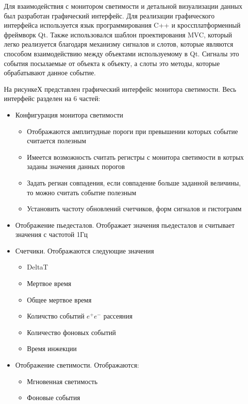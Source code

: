   Для взаимодействия с монитором светимости и детальной визуализации данных был разработан графический интерфейс. Для реализации графического интерфейса используется язык программирования C++ и кроссплатформенный фреймворк Qt. Также использовался шаблон проектирования MVC, который легко реализуется благодаря механизму сигналов и слотов, которые являются способом взаимодействию между объектами используемому в Qt. Сигналы это события посылаемые от объекта к объекту, а слоты это методы, которые обрабатывают данное событие.\par
  На рисункеХ представлен графический интерфейс монитора светимости. Весь интерфейс разделен на 6 частей:
\begin{itemize}
  \item Конфигурация монитора светимости
    \begin{itemize}
      \item Отображаются амплитудные пороги при превышении которых событие считается полезным
      \item Имеется возможность считать регистры с монитора светимости в котрых заданы значения данных порогов
      \item Задать региан совпадения, если совпадение больше заданной величины, то можно считать событие полезным
      \item Установить частоту обновлений счетчиков, форм сигналов и гистограмм
    \end{itemize} 
  \item Отображение пьедесталов. Отображает значения пьедесталов и считывает значения с частотой 1Гц
  \item Счетчики. Отображаются следующие значения
    \begin{itemize}
      \item DeltaT
      \item Мертвое время 
      \item Общее мертвое время
      \item Количство событий $e^+e^-$ рассеяния
      \item Количество фоновых событий
      \item Время инжекции
    \end{itemize}
  \item Отображение светимости. Отображаются:
    \begin{itemize}
      \item Мгновенная светимость
      \item Фоновые события
    \end{itemize}

\end{itemize}
